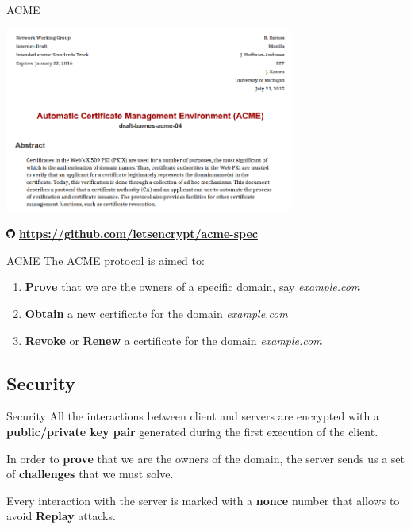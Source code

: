 \documentclass[xcolor=svgnames,11pt]{beamer}
\begin{document}
\begin{frame}{ACME}
\begin{center}
\includegraphics[width=9.5cm]{img/acme_spec.png}

\includegraphics[width=0.3cm]{img/logo_gh.pdf} \textbf{ \url{https://github.com/letsencrypt/acme-spec}}
\end{center}
\end{frame}


\begin{frame}{ACME}
The ACME protocol is aimed to:
\pause\medskip
\begin{enumerate}
  \item \textbf{Prove} that we are the owners of a specific domain, say \emph{example.com}
  \pause\medskip
  \item \textbf{Obtain} a new certificate for the domain \emph{example.com}
  \pause\medskip
  \item \textbf{Revoke} or \textbf{Renew} a certificate for the domain \emph{example.com}
\end{enumerate}
\end{frame}

\subsection{Security}
\begin{frame}{Security}
All the interactions between client and servers are encrypted with a \textbf{public/private key pair} generated during the first execution of the client.

\medskip \pause

\begin{block}{}
In order to \textbf{prove} that we are the owners of the domain, the server sends us a set of \textbf{challenges} that we must solve.
\end{block}

\medskip \pause

Every interaction with the server is marked with a \textbf{nonce} number that allows to avoid \textbf{Replay} attacks.

\end{frame}
\end{document}
